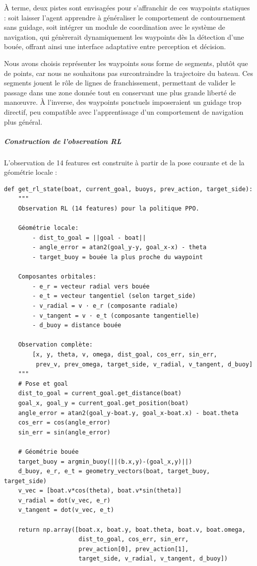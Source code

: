À terme, deux pistes sont envisagées pour s'affranchir de ces waypoints statiques : soit laisser l'agent apprendre à généraliser le comportement de contournement sans guidage, soit intégrer un module de coordination avec le système de navigation, qui génèrerait dynamiquement les waypoints dès la détection d'une bouée, offrant ainsi une interface adaptative entre perception et décision.

Nous avons choisis représenter les waypoints sous forme de segments, plutôt que de points, car nous ne souhaitons pas surcontraindre la trajectoire du bateau. Ces segments jouent le rôle de lignes de franchissement, permettant de valider le passage dans une zone donnée tout en conservant une plus grande liberté de manœuvre. À l’inverse, des waypoints ponctuels imposeraient un guidage trop directif, peu compatible avec l’apprentissage d’un comportement de navigation plus général.

\subparagraph{Construction de l'observation RL}

L'observation de 14 features est construite à partir de la pose courante et de la géométrie locale :

\begin{verbatim}
def get_rl_state(boat, current_goal, buoys, prev_action, target_side):
    """
    Observation RL (14 features) pour la politique PPO.
    
    Géométrie locale:
        - dist_to_goal = ||goal - boat||
        - angle_error = atan2(goal_y-y, goal_x-x) - theta
        - target_buoy = bouée la plus proche du waypoint
        
    Composantes orbitales:
        - e_r = vecteur radial vers bouée
        - e_t = vecteur tangentiel (selon target_side)
        - v_radial = v · e_r (composante radiale)
        - v_tangent = v · e_t (composante tangentielle)
        - d_buoy = distance bouée
    
    Observation complète:
        [x, y, theta, v, omega, dist_goal, cos_err, sin_err, 
         prev_v, prev_omega, target_side, v_radial, v_tangent, d_buoy]
    """
    # Pose et goal
    dist_to_goal = current_goal.get_distance(boat)
    goal_x, goal_y = current_goal.get_position(boat)
    angle_error = atan2(goal_y-boat.y, goal_x-boat.x) - boat.theta
    cos_err = cos(angle_error)
    sin_err = sin(angle_error)
    
    # Géométrie bouée
    target_buoy = argmin_buoy(||(b.x,y)-(goal_x,y)||)
    d_buoy, e_r, e_t = geometry_vectors(boat, target_buoy, target_side)
    v_vec = [boat.v*cos(theta), boat.v*sin(theta)]
    v_radial = dot(v_vec, e_r)
    v_tangent = dot(v_vec, e_t)
    
    return np.array([boat.x, boat.y, boat.theta, boat.v, boat.omega,
                     dist_to_goal, cos_err, sin_err,
                     prev_action[0], prev_action[1],
                     target_side, v_radial, v_tangent, d_buoy])
\end{verbatim}

